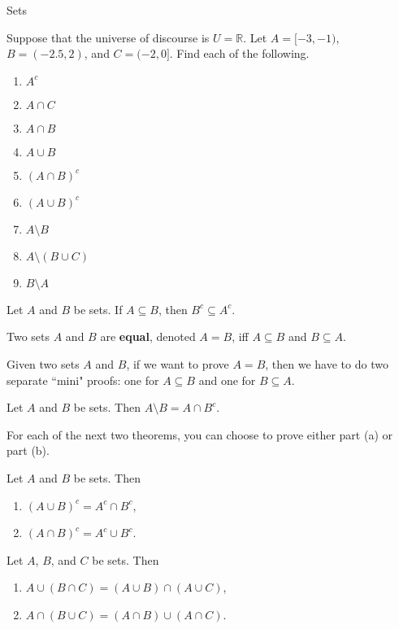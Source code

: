 \begin{section}{Sets}
\begin{exercise}
Suppose that the universe of discourse is $U=\mathbb{R}$.  Let $A=[-3,-1)$, $B=(-2.5,2)$, and $C=(-2,0]$.  Find each of the following.
\begin{multicols}{2}
\begin{enumerate}[label=\textrm{(\alph*)}]
\item $A^c$
\item $A \cap C$
\item $A \cap B$
\item $A \cup B$
\item $(A\cap B)^c$
\item $(A\cup B)^c$
\item $A \setminus B$
\item $A\setminus (B \cup C)$
\item $B \setminus A$
\end{enumerate}
\end{multicols}
\end{exercise}

\begin{theorem}
Let $A$ and $B$ be sets.  If $A \subseteq B$, then $B^c \subseteq A^c$.
\end{theorem}

\begin{definition}
Two sets $A$ and $B$ are \textbf{equal}, denoted $\boxed{A=B}$, iff $A \subseteq B$ and $B \subseteq A$.
\end{definition}

Given two sets $A$ and $B$, if we want to prove $A=B$, then we have to do two separate ``mini" proofs: one for $A\subseteq B$ and one for $B\subseteq A$.

\begin{theorem}
Let $A$ and $B$ be sets.  Then $A\setminus B = A \cap B^c$.
\end{theorem}

For each of the next two theorems, you can choose to prove either part (a) or part (b).

\begin{theorem}
Let $A$ and $B$ be sets. Then 
\begin{enumerate}[label=\textrm{(\alph*)}]
\item $(A \cup B)^c = A^c \cap B^c$,
\item $(A \cap B)^c = A^c \cup B^c$.
\end{enumerate}
\end{theorem}

\begin{theorem}
Let $A$, $B$, and $C$ be sets. Then
\begin{enumerate}[label=\textrm{(\alph*)}]
\item $A \cup(B\cap C) = (A\cup B)\cap (A\cup C)$,
\item $A\cap (B\cup C)= (A\cap B)\cup (A\cap C)$.
\end{enumerate}
\end{theorem}

\end{section}